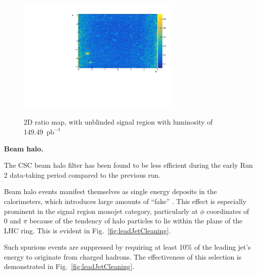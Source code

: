 \begin{figure}[h!]
    \begin{center}
        {\includegraphics[width=0.7\textwidth]{figures/selection/EtaPhiMap.pdf}}
        \caption{2D ratio map, with unblinded signal region with luminosity of 149.49~$\text{pb}^{-1}$}
        \label{fig:2dRatioMap}
    \end{center}
\end{figure}




{\bf Beam halo.}

The CSC beam halo filter has been found to be less efficient during the early
Run 2 data-taking period compared to the previous run.

Beam halo events manifest themselves as single energy deposits in the
calorimeters, which introduces large amounts of ``fake'' \met. This effect is
especially prominent in the signal region monojet category, particularly at
$\phi$ coordinates of 0 and $\pi$ because of the tendency of halo particles to
lie within the plane of the LHC ring. This is evident in
Fig.~\ref{fig:leadJetCleaning}.

Such spurious events are suppressed by requiring at least 10\% of the leading
jet's energy to originate from charged hadrons. The effectiveness of this selection
is demonstrated in Fig.~\ref{fig:leadJetCleaning}.

